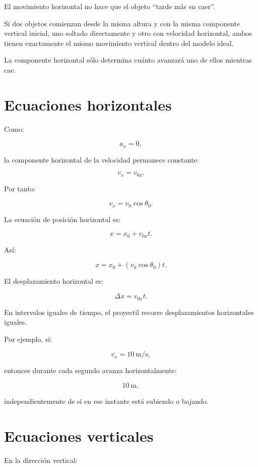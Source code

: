 \begin{interpretacion}
El movimiento horizontal no hace que el objeto ``tarde más en caer''.

Si dos objetos comienzan desde la misma altura y con la misma componente
vertical inicial, uno soltado directamente y otro con velocidad horizontal,
ambos tienen exactamente el mismo movimiento vertical dentro del modelo ideal.

La componente horizontal sólo determina cuánto avanzará uno de ellos mientras
cae.
\end{interpretacion}


\section{Ecuaciones horizontales}

Como:

\[
a_x=0,
\]

la componente horizontal de la velocidad permanece constante:

\[
v_x=v_{0x}.
\]

Por tanto:

\[
\boxed{
v_x=v_0\cos\theta_0
}.
\]

La ecuación de posición horizontal es:

\[
x=x_0+v_{0x}t.
\]

Así:

\[
\boxed{
x=x_0+(v_0\cos\theta_0)t
}.
\]

El desplazamiento horizontal es:

\[
\boxed{
\Delta x=v_{0x}t
}.
\]

\begin{interpretacion}
En intervalos iguales de tiempo, el proyectil recorre desplazamientos
horizontales iguales.

Por ejemplo, si:

\[
v_x=\SI{10}{\meter\per\second},
\]

entonces durante cada segundo avanza horizontalmente:

\[
\SI{10}{\meter},
\]

independientemente de si en ese instante está subiendo o bajando.
\end{interpretacion}


\section{Ecuaciones verticales}

En la dirección vertical:

